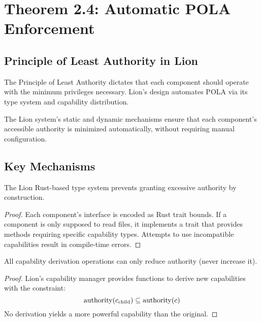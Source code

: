 \section{Theorem 2.4: Automatic POLA Enforcement}

\subsection{Principle of Least Authority in Lion}

The Principle of Least Authority dictates that each component should operate with the minimum privileges necessary. Lion's design automates POLA via its type system and capability distribution.

\begin{theorem}
The Lion system's static and dynamic mechanisms ensure that each component's accessible authority is minimized automatically, without requiring manual configuration.
\end{theorem}

\subsection{Key Mechanisms}

\begin{lemma}
The Lion Rust-based type system prevents granting excessive authority by construction.
\end{lemma}

\begin{proof}
Each component's interface is encoded as Rust trait bounds. If a component is only supposed to read files, it implements a trait that provides methods requiring specific capability types. Attempts to use incompatible capabilities result in compile-time errors.
\end{proof}

\begin{lemma}
All capability derivation operations can only reduce authority (never increase it).
\end{lemma}

\begin{proof}
Lion's capability manager provides functions to derive new capabilities with the constraint:
\begin{equation}
\text{authority}(c_{\text{child}}) \subseteq \text{authority}(c)
\end{equation}
No derivation yields a more powerful capability than the original.
\end{proof}

